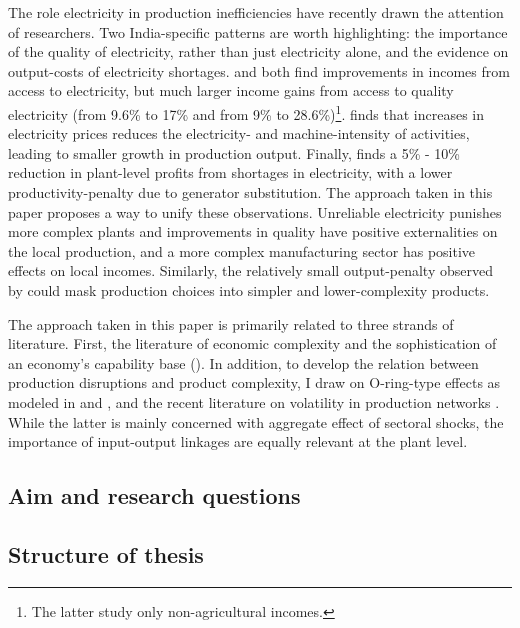 \documentclass[11pt]{article}
\begin{document}
The role electricity in production inefficiencies have recently drawn the attention of researchers. Two India-specific patterns are worth highlighting: the importance of the quality of electricity, rather than just electricity alone, and the evidence on output-costs of electricity shortages. \cite{samad_benefits_2016} and \cite{chakravorty_does_2014} both find improvements in incomes from access to electricity, but much larger income gains from access to quality electricity (from 9.6\% to 17\% and from 9\% to 28.6\%)\footnote{The latter study only non-agricultural incomes.}. \cite{abeberese_electricity_2017} finds that increases in electricity prices reduces the electricity- and machine-intensity of activities, leading to smaller growth in production output. Finally, \cite{allcott_how_2016} finds a 5\% - 10\% reduction in plant-level profits from shortages in electricity, with a lower productivity-penalty due to generator substitution. The approach taken in this paper proposes a way to unify these observations. Unreliable electricity punishes more complex plants and improvements in quality have positive externalities on the local production, and a more complex manufacturing sector has positive effects on local incomes. Similarly, the relatively small output-penalty observed by \cite{allcott_how_2016} could mask production choices into simpler and lower-complexity products.

The approach taken in this paper is primarily related to three strands of literature. First, the literature of economic complexity and the sophistication of an economy's capability base  (\citealp{frenken_related_2007,hausmann_atlas_2013,tacchella_new_2012}). In addition, to develop the relation between production disruptions and product complexity, I draw on O-ring-type effects as modeled in \cite{kremer_o-ring_1993} and \cite{jones_intermediate_2011}, and the recent literature on volatility in production networks \citep{acemoglu_network_2012}. While the latter is mainly concerned with aggregate effect of sectoral shocks, the importance of input-output linkages are equally relevant at the plant level.

\subsection{Aim and research questions}%
\label{sub:aim_and_research_questions}

\subsection{Structure of thesis}%
\label{sub:structure_of_thesis}
\end{document}
